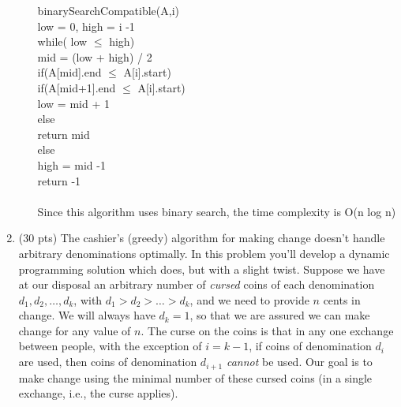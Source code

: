 \documentclass[12pt]{article}
\begin{document}
\begin{enumerate}
\begin{enumerate}
binarySearchCompatible(A,i) \\
\hspace*{10mm} low = 0, high = i -1 \\
\hspace*{10mm} while( low $\leq$ high) \\
\hspace*{15mm} mid = (low + high) / 2 \\
\hspace*{15mm} if(A[mid].end $\leq$ A[i].start)\\
\hspace*{20mm} if(A[mid+1].end $\leq$ A[i].start) \\
\hspace*{25mm} low = mid + 1 \\
\hspace*{20mm} else \\
\hspace*{25mm} return mid \\
\hspace*{15mm} else \\
\hspace*{20mm} high = mid -1 \\
\hspace*{10mm} return -1
\\
\\Since this algorithm uses binary search, the time complexity is O(n log n) 


\pagebreak
\end{enumerate}

\item (30 pts) 
The cashier's (greedy) algorithm for making change doesn't handle arbitrary
denominations optimally. In this problem you'll develop a dynamic
programming solution which does, but with a slight twist. Suppose we
have at our disposal an arbitrary number of \emph{cursed} coins of each
denomination $d_1, d_2, \dotsc, d_k$, with $d_1 > d_2 > \dotsc > d_k$,
and we need to provide $n$ cents in change. We will always have
$d_k=1$, so that we are assured we can make change for any value of
$n$. The curse on the coins is that in any one exchange between people,
with the exception of $i=k-1$, if coins of denomination $d_i$ are used,
then coins of denomination $d_{i+1}$ \emph{cannot} be used. Our goal is
to make change using the minimal number of these cursed coins (in a
single exchange, i.e., the curse applies).
\pagebreak
	

\end{enumerate}
\end{document}
